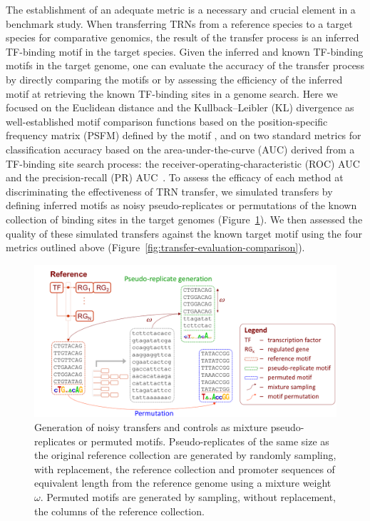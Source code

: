The establishment of an adequate metric is a necessary and crucial element in a
benchmark study. When transferring TRNs from a reference species to a target
species for comparative genomics, the result of the transfer process is an
inferred TF-binding motif in the target species. Given the inferred and known
TF-binding motifs in the target genome, one can evaluate the accuracy of the
transfer process by directly comparing the motifs or by assessing the
efficiency of the inferred motif at retrieving the known TF-binding sites in a
genome search. Here we focused on the Euclidean distance and the
Kullback–Leibler (KL) divergence as well-established motif comparison functions
based on the position-specific frequency matrix (PSFM) defined by the motif
\citep{gupta2007quantifying}, and on two standard metrics for classification
accuracy based on the area-under-the-curve (AUC) derived from a TF-binding site
search process: the receiver-operating-characteristic (ROC) AUC and the
precision-recall (PR) AUC~\citep{lewis1991evaluating, zweig1993receiver}. To
assess the efficacy of each method at discriminating the effectiveness of TRN
transfer, we simulated transfers by defining inferred motifs as noisy
pseudo-replicates or permutations of the known collection of binding sites in
the target genomes (Figure~\ref{fig:pseudoreplicate-generation}). We then
assessed the quality of these simulated transfers against the known target
motif using the four metrics outlined above
(Figure~\ref{fig:transfer-evaluation-comparison}).

\begin{figure}
  \centering
  \includegraphics[width=\textwidth]{figures/chapter3/pseudoreplicate-generation}
  \caption[Generation of noisy transfers and controls as mixture
  pseudo-replicates or permuted motifs.]{Generation of noisy transfers and
    controls as mixture pseudo-replicates or permuted motifs. Pseudo-replicates
    of the same size as the original reference collection are generated by
    randomly sampling, with replacement, the reference collection and promoter
    sequences of equivalent length from the reference genome using a mixture
    weight $\omega$. Permuted motifs are generated by sampling, without
    replacement, the columns of the reference collection.}
\label{fig:pseudoreplicate-generation}
\end{figure}

